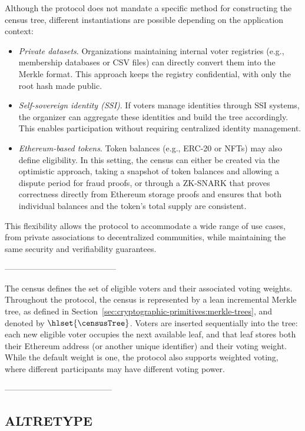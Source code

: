 Although the protocol does not mandate a specific method for constructing the census tree, different instantiations are possible depending on the application context:
%
\begin{itemize}
	\item \emph{Private datasets}. Organizations maintaining internal voter registries (e.g., membership databases or CSV files) can directly convert them into the Merkle format. This approach keeps the registry confidential, with only the root hash made public.
	\item \emph{Self-sovereign identity (SSI)}. If voters manage identities through SSI systems, the organizer can aggregate these identities and build 
	the tree accordingly. This enables participation without requiring centralized identity management.
	\item \textit{Ethereum-based tokens}. Token balances (e.g., ERC-20 or NFTs) may also define eligibility. In this setting, the census can either be created via the optimistic approach, taking a snapshot of token balances and allowing a dispute period for fraud proofs, or through a ZK-SNARK that proves correctness directly from Ethereum storage proofs and ensures that both individual balances and the token’s total supply are consistent. 
\end{itemize}
%
This flexibility allows the protocol to accommodate a wide range of use cases, from private associations to decentralized communities, while maintaining the same security and verifiability guarantees.

-----------------------------------------


The census defines the set of eligible voters and their associated voting weights. Throughout the protocol, the census is represented by a lean incremental Merkle tree, as defined in Section~\ref{sec:cryptographic-primitives:merkle-trees}, and denoted by $\hlset{\censusTree}$. Voters are inserted sequentially into the tree: each new eligible voter occupies the next available leaf, and that leaf stores both their Ethereum address (or another unique identifier) and their voting weight. While the default weight is one, the protocol also supports weighted voting, where different participants may have different voting power.





---------------------------------------

\subsection{ALTRETYPE}

